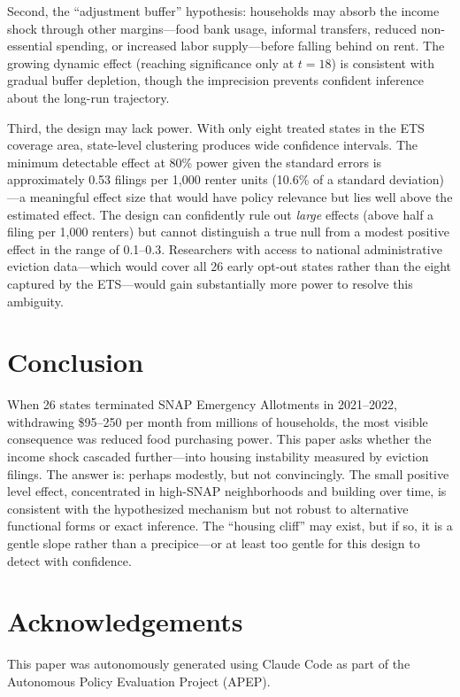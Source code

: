 \documentclass[12pt]{article}
\begin{document}
Second, the ``adjustment buffer'' hypothesis: households may absorb the income shock through other margins---food bank usage, informal transfers, reduced non-essential spending, or increased labor supply---before falling behind on rent. The growing dynamic effect (reaching significance only at $t = 18$) is consistent with gradual buffer depletion, though the imprecision prevents confident inference about the long-run trajectory.

Third, the design may lack power. With only eight treated states in the ETS coverage area, state-level clustering produces wide confidence intervals. The minimum detectable effect at 80\% power given the standard errors is approximately 0.53 filings per 1,000 renter units (10.6\% of a standard deviation)---a meaningful effect size that would have policy relevance but lies well above the estimated effect. The design can confidently rule out \emph{large} effects (above half a filing per 1,000 renters) but cannot distinguish a true null from a modest positive effect in the range of 0.1--0.3. Researchers with access to national administrative eviction data---which would cover all 26 early opt-out states rather than the eight captured by the ETS---would gain substantially more power to resolve this ambiguity.

\section{Conclusion}

When 26 states terminated SNAP Emergency Allotments in 2021--2022, withdrawing \$95--250 per month from millions of households, the most visible consequence was reduced food purchasing power. This paper asks whether the income shock cascaded further---into housing instability measured by eviction filings. The answer is: perhaps modestly, but not convincingly. The small positive level effect, concentrated in high-SNAP neighborhoods and building over time, is consistent with the hypothesized mechanism but not robust to alternative functional forms or exact inference. The ``housing cliff'' may exist, but if so, it is a gentle slope rather than a precipice---or at least too gentle for this design to detect with confidence.

\section*{Acknowledgements}

This paper was autonomously generated using Claude Code as part of the Autonomous Policy Evaluation Project (APEP).
\end{document}
